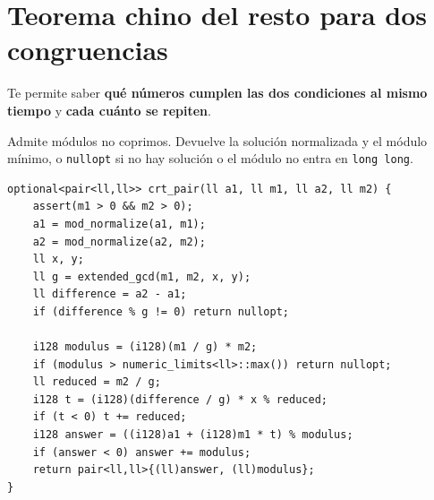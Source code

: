 
\section{Teorema chino del resto para dos congruencias}
Te permite saber \textbf{qu\'e n\'umeros cumplen las dos condiciones al mismo
tiempo} y \textbf{cada cu\'anto se repiten}.


Admite m\'odulos no coprimos. Devuelve la soluci\'on normalizada y el m\'odulo
m\'inimo, o \texttt{nullopt} si no hay soluci\'on o el m\'odulo no entra en
\texttt{long long}.

\begin{lstlisting}[style=cpp]
optional<pair<ll,ll>> crt_pair(ll a1, ll m1, ll a2, ll m2) {
    assert(m1 > 0 && m2 > 0);
    a1 = mod_normalize(a1, m1);
    a2 = mod_normalize(a2, m2);
    ll x, y;
    ll g = extended_gcd(m1, m2, x, y);
    ll difference = a2 - a1;
    if (difference % g != 0) return nullopt;

    i128 modulus = (i128)(m1 / g) * m2;
    if (modulus > numeric_limits<ll>::max()) return nullopt;
    ll reduced = m2 / g;
    i128 t = (i128)(difference / g) * x % reduced;
    if (t < 0) t += reduced;
    i128 answer = ((i128)a1 + (i128)m1 * t) % modulus;
    if (answer < 0) answer += modulus;
    return pair<ll,ll>{(ll)answer, (ll)modulus};
}
\end{lstlisting}
